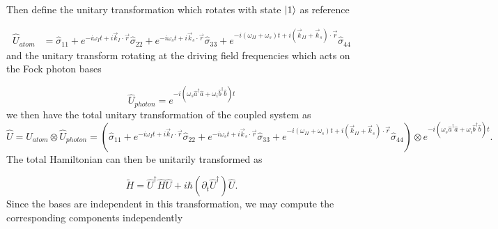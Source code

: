 \documentclass[aps,pra,showpacs,amsmath,amssymb,nofootinbib,longbibliography,superscriptaddress
]{revtex4-1}
\DeclarePairedDelimiter\ket{\lvert}{\rangle}
\theoremstyle{definition}
\theoremstyle{remark}
\newcommand{\0}{\hat{0}}
\begin{document}
Then define the unitary transformation which rotates with state $\ket{1}$ as reference

\begin{align}
    \hat{U}_{atom} &= \hat{\sigma}_{11} + e^{-i \omega_I t + i \vec{k}_I \cdot \vec{r}} \hat{\sigma}_{22} + e^{-i \omega_s t + i \vec{k}_s \cdot \vec{r}} \hat{\sigma}_{33} + e^{-i(\omega_{II} + \omega_s) t + i(\vec{k}_{II} + \vec{k}_s) \cdot \vec{r}} \hat{\sigma}_{44}
\end{align}
and the unitary transform rotating at the driving field frequencies which acts on the Fock photon bases

\begin{equation}
    \hat{U}_{photon} = e^{-i(\omega_s \hat{a}^{\dagger} \hat{a} + \omega_i \hat{b}^{\dagger} \hat{b})t}
\end{equation}
we then have the total unitary transformation of the coupled system as
\begin{equation}
    \hat{U} = \hat{U}_{atom} \otimes \hat{U}_{photon} =
    \left(
        \hat{\sigma}_{11} +
        e^{-i \omega_I t + i \vec{k}_I \cdot \vec{r}} \hat{\sigma}_{22} +
        e^{-i \omega_s t + i \vec{k}_s \cdot \vec{r}} \hat{\sigma}_{33} +
        e^{-i(\omega_{II} + \omega_s) t + i(\vec{k}_{II} + \vec{k}_s) \cdot \vec{r}} \hat{\sigma}_{44}
    \right)
    \otimes e^{-i(\omega_s \hat{a}^{\dagger} \hat{a} + \omega_i \hat{b}^{\dagger} \hat{b})t}.
\end{equation}
The total Hamiltonian can then be unitarily transformed as

\begin{equation}
    \tilde{H} = \hat{U}^{\dagger} \hat{H} \hat{U} + i \hbar (\partial_t \hat{U}^{\dagger}) \hat{U}.
\end{equation}
Since the bases are independent in this transformation, we may compute the corresponding components independently
\end{document}
